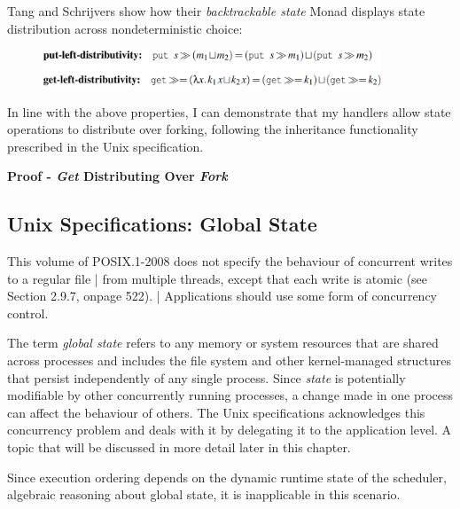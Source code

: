 \documentclass[logo,bsc,singlespacing,parskip]{infthesis}
\begin{document}
Tang and Schrijvers \cite{tang2025high} show how their \textit{backtrackable state} Monad displays state distribution across nondeterministic choice:


\begin{figure}[H]  %
  \centering
  \includegraphics[width=0.9\textwidth]{distributivity.png}  %
  
\end{figure}

In line with the above properties, I can demonstrate that my handlers allow state operations to distribute over forking, following the inheritance functionality prescribed in the Unix specification. 


{\large{\textbf{Proof - \textit{Get} Distributing Over \textit{Fork}}}}







\subsection{Unix Specifications: Global State }

\begin{tcolorbox}[colback=gray!10, colframe=gray!60, sharp corners, boxrule=0.5pt, title={POSIX Base Specifications, Issue 7, p.2316}]
 This volume of POSIX.1-2008 does not specify the behaviour of concurrent writes to a regular file |
 from multiple threads, except that each write is atomic (see Section 2.9.7, onpage 522). |
 Applications should use some form of concurrency control.
\end{tcolorbox}

The term \textit{global state} refers to any memory or system resources that are shared across processes and includes the file system and other kernel-managed structures that persist independently of any single process. Since \textit{state} is potentially modifiable by other concurrently running processes, a change made in one process can affect the behaviour of others. The Unix specifications acknowledges this concurrency problem and deals with it by delegating it to the application level. A topic that will be discussed in more detail later in this chapter.

Since execution ordering depends on the dynamic runtime state of the scheduler, algebraic reasoning about global state, it is inapplicable in this scenario. 
\end{document}
